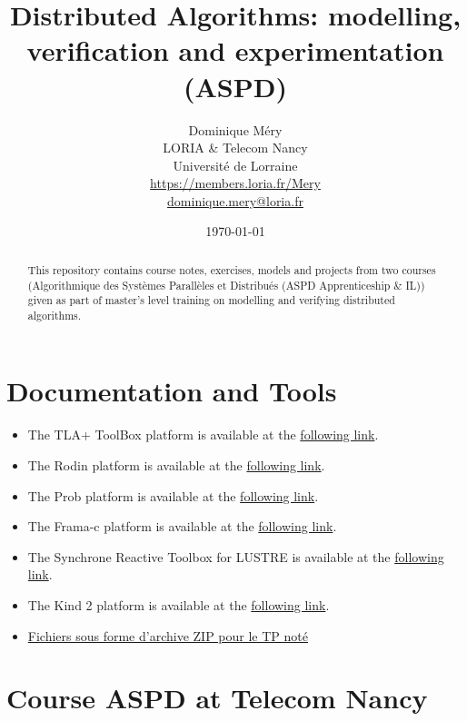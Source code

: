 \documentclass[ 12pt]{article}
\title{Distributed Algorithms:  modelling,  verification   and experimentation  (ASPD)}
\author{Dominique M\'ery\\
LORIA \& Telecom Nancy\\ Universit\'e de Lorraine\\
\url{https://members.loria.fr/Mery}\\ \url{dominique.mery@loria.fr}}
\date{\today\\ \now}
\begin{document}
  \setcounter{ex}{1}
\maketitle
\begin{abstract}
This repository contains course notes, exercises, models and projects
from two  courses (Algorithmique des Systèmes Parallèles et Distribués
(ASPD Apprenticeship \& IL))  given as part of master's level training on
modelling and verifying  distributed algorithms.

\end{abstract}

\tableofcontents


\section{Documentation and Tools}

\begin{itemize}

    
\item[]  The  TLA+ ToolBox  platform is available at the 
  \href{https://lamport.azurewebsites.net/tla/toolbox.html}{following 
    link}. 
\item[]  The Rodin platform is available at the 
  \href{https://www.event-b.org/install.html}{following 
    link}.

  
  \item[]  The Prob   platform is available at the 
  \href{https://prob.hhu.de}{following 
    link}. 

  
  \item[]  The Frama-c platform is available at the 
  \href{https://www.frama-c.com}{following 
    link}.

  \item[]  The Synchrone Reactive Toolbox for LUSTRE is   available at the 
  \href{https://www-verimag.imag.fr/Outils-SynchronesNEW.html?lang=en}{following 
    link}.

  \item[]  The Kind 2  platform is available at the 
  \href{ https://kind2-mc.github.io/kind2/}{following 
    link}.

  
\item
  \href{http://mery54.github.io/teaching/aspd/lecturesnotes/aspd-files26.zip}{Fichiers
    sous forme d'archive ZIP pour le TP noté}
 \end{itemize}




\section{Course  ASPD  at Telecom Nancy}
\label{sec:course-mcfsi-at}
\end{document}
